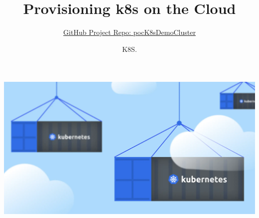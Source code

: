 
\title{Provisioning k8s on the Cloud} %
\subtitle{
    \href{https://github.com/thanos1983/pocK8sDemoCluster}
    {GitHub Project Repo: pocK8sDemoCluster}
}

\author[Athanasios Garyfalos]{K8S. \vspace{-.5cm}} %

\begin{frame}[noframenumbering]
	\begin{center}
	 \includegraphics[width=1.0\textwidth]{png/kubernetesOnTheCloud}\\ %
	\end{center}
	\vspace{-.5cm}
	\titlepage
\end{frame}
